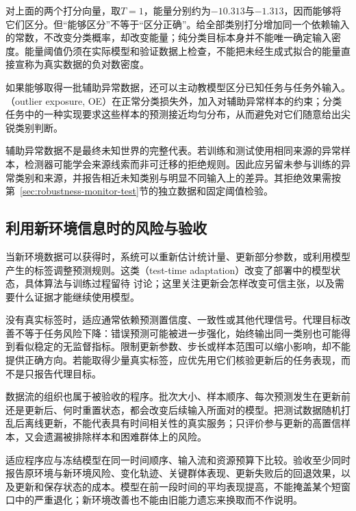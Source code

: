 对上面的两个打分向量，取$T=1$，能量分别约为$-10.313$与$-1.313$，因而能够将它们区分。但“能够区分”不等于“区分正确”。给全部类别打分增加同一个依赖输入的常数，不改变分类概率，却改变能量；纯分类目标本身并不能唯一确定输入密度。能量阈值仍须在实际模型和验证数据上检查，不能把未经生成式拟合的能量直接宣称为真实数据的负对数密度。

如果能够取得一批辅助异常数据，还可以主动教模型区分已知任务与任务外输入。（outlier exposure, OE）在正常分类损失外，加入对辅助异常样本的约束；分类任务中的一种实现要求这些样本的预测接近均匀分布，从而避免对它们随意给出尖锐类别判断。

辅助异常数据不是最终未知世界的完整代表。若训练和测试使用相同来源的异常样本，检测器可能学会来源线索而非可迁移的拒绝规则。因此应另留未参与训练的异常类别和来源，并报告相近未知类别与明显不同输入上的差异。其拒绝效果需按第~\ref{sec:robustness-monitor-test}节的独立数据和固定阈值检验。

\subsection{利用新环境信息时的风险与验收}
\label{sec:robustness-adaptation}

当新环境数据可以获得时，系统可以重新估计统计量、更新部分参数，或利用模型产生的标签调整预测规则。这类（test-time adaptation）改变了部署中的模型状态，具体算法与训练过程留待
讨论；这里关注更新会怎样改变可信主张，以及需要什么证据才能继续使用模型。

没有真实标签时，适应通常依赖预测置信度、一致性或其他代理信号。代理目标改善不等于任务风险下降：错误预测可能被进一步强化，始终输出同一类别也可能得到看似稳定的无监督指标。限制更新参数、步长或样本范围可以缩小影响，却不能提供正确方向。若能取得少量真实标签，应优先用它们核验更新后的任务表现，而不是只报告代理目标。

数据流的组织也属于被验收的程序。批次大小、样本顺序、每次预测发生在更新前还是更新后、何时重置状态，都会改变后续输入所面对的模型。把测试数据随机打乱后离线更新，不能代表具有时间相关性的真实服务；只评价参与更新的高置信样本，又会遗漏被排除样本和困难群体上的风险。

适应程序应与冻结模型在同一时间顺序、输入流和资源预算下比较。验收至少同时报告原环境与新环境风险、变化轨迹、关键群体表现、更新失败后的回退效果，以及更新和保存状态的成本。模型在前一段时间的平均表现提高，不能掩盖某个短窗口中的严重退化；新环境改善也不能由旧能力遗忘来换取而不作说明。

